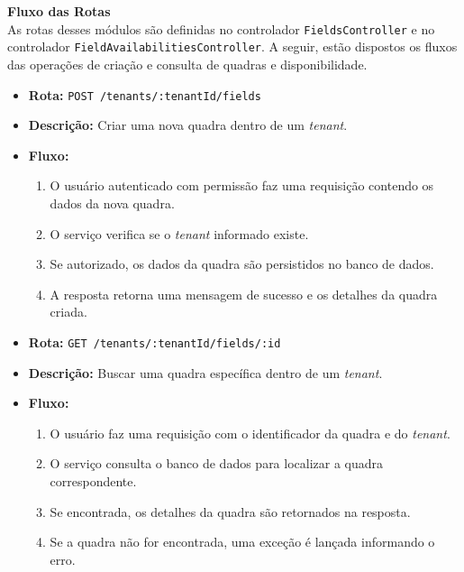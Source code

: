 \noindent\textbf{Fluxo das Rotas}\\
As rotas desses módulos são definidas no controlador \texttt{FieldsController} e no controlador \texttt{FieldAvailabilitiesController}.
A seguir, estão dispostos os fluxos das operações de criação e consulta de quadras e disponibilidade.

\begin{itemize}
    \item \textbf{Rota:} \texttt{POST /tenants/:tenantId/fields}
    \item \textbf{Descrição:} Criar uma nova quadra dentro de um \textit{tenant}.
    \item \textbf{Fluxo:}
    \begin{enumerate}
        \item O usuário autenticado com permissão faz uma requisição contendo os dados da nova quadra.
        \item O serviço verifica se o \textit{tenant} informado existe.
        \item Se autorizado, os dados da quadra são persistidos no banco de dados.
        \item A resposta retorna uma mensagem de sucesso e os detalhes da quadra criada.
    \end{enumerate}
\end{itemize}

\begin{itemize}
    \item \textbf{Rota:} \texttt{GET /tenants/:tenantId/fields/:id}
    \item \textbf{Descrição:} Buscar uma quadra específica dentro de um \textit{tenant}.
    \item \textbf{Fluxo:}
    \begin{enumerate}
        \item O usuário faz uma requisição com o identificador da quadra e do \textit{tenant}.
        \item O serviço consulta o banco de dados para localizar a quadra correspondente.
        \item Se encontrada, os detalhes da quadra são retornados na resposta.
        \item Se a quadra não for encontrada, uma exceção é lançada informando o erro.
    \end{enumerate}
\end{itemize}

